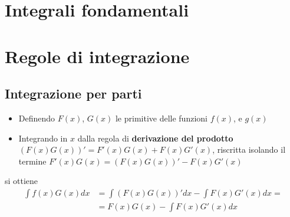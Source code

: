 \section{Integrali fondamentali}

\section{Regole di integrazione}
\subsection{Integrazione per parti}
\begin{itemize}
 \item Definendo $F(x)$, $G(x)$ le primitive delle funzioni $f(x)$, e $g(x)$
 \item Integrando in $x$ dalla regola di \textbf{derivazione del prodotto} $(F(x)G(x))' = F'(x)G(x) + F(x)G'(x)$, riscritta isolando il termine $F'(x)G(x) = (F(x)G(x))' - F(x)G'(x)$
\end{itemize}
si ottiene
\begin{equation}
\begin{aligned}
    \int f(x) G(x) dx & = \int (F(x) G(x))' dx - \int F(x) G'(x) dx = \\
    &= F(x)G(x) - \int F(x) G'(x) dx 
\end{aligned}
\end{equation}

\begin{example}
\end{example}

